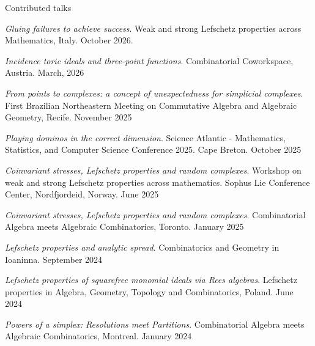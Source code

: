 \documentclass[12pt]{resume} %
\begin{document}
\begin{rSection}{Contributed talks}
    \item \textit{Gluing failures to achieve success}. Weak and strong Lefschetz properties across Mathematics, Italy. October 2026.  
    \item \textit{Incidence toric ideals and three-point functions}. Combinatorial Coworkspace, Austria. March, 2026 
    \item \textit{From points to complexes: a concept of unexpectedness for simplicial complexes}. First Brazilian Northeastern Meeting on Commutative Algebra and Algebraic Geometry, Recife. November 2025 
    \item \textit{Playing dominos in the correct dimension}. Science Atlantic - Mathematics, Statistics, and Computer Science Conference 2025. Cape Breton. October 2025 
    \item \textit{Coinvariant stresses, Lefschetz properties and random complexes}. Workshop on weak and strong Lefschetz properties across mathematics. Sophus Lie Conference Center, Nordfjordeid, Norway. June 2025 
    \item \textit{Coinvariant stresses, Lefschetz properties and random complexes}. Combinatorial Algebra meets Algebraic Combinatorics, Toronto. January 2025 
    \item \textit{Lefschetz properties and analytic spread}. Combinatorics and Geometry in Ioaninna. September 2024 
    \item \textit{Lefschetz properties of squarefree monomial ideals via Rees algebras}. Lefschetz properties in Algebra, Geometry, Topology and Combinatorics, Poland. June 2024  
    \item \textit{Powers of a simplex: Resolutions meet Partitions}. Combinatorial Algebra meets Algebraic Combinatorics, Montreal. January 2024 

\end{rSection}
\end{document}

